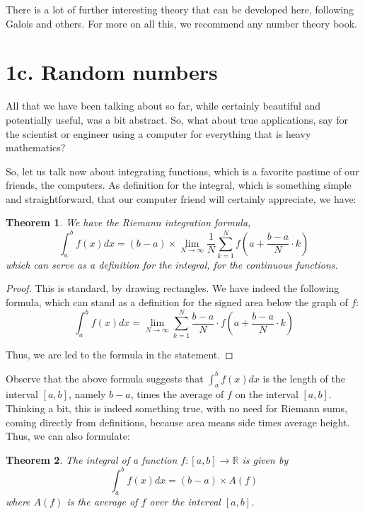 \documentclass[12pt]{amsbook}
\newtheorem{theorem}{Theorem}[chapter]
\begin{document}
There is a lot of further interesting theory that can be developed here, following Galois and others. For more on all this, we recommend any number theory book.

\section*{1c. Random numbers}

All that we have been talking about so far, while certainly beautiful and potentially useful, was a bit abstract. So, what about true applications, say for the scientist or engineer using a computer for everything that is heavy mathematics?

\bigskip

So, let us talk now about integrating functions, which is a favorite pastime of our friends, the computers. As definition for the integral, which is something simple and straightforward, that our computer friend will certainly appreciate, we have:


\begin{theorem}
We have the Riemann integration formula,
$$\int_a^bf(x)dx=(b-a)\times\lim_{N\to\infty}\frac{1}{N}\sum_{k=1}^Nf\left(a+\frac{b-a}{N}\cdot k\right)$$
which can serve as a definition for the integral, for the continuous functions.
\end{theorem}

\begin{proof}
This is standard, by drawing rectangles. We have indeed the following formula, which can stand as a definition for the signed area below the graph of $f$:
$$\int_a^bf(x)dx=\lim_{N\to\infty}\sum_{k=1}^N\frac{b-a}{N}\cdot f\left(a+\frac{b-a}{N}\cdot k\right)$$

Thus, we are led to the formula in the statement.
\end{proof}

Observe that the above formula suggests that $\int_a^bf(x)dx$ is the length of the interval $[a,b]$, namely $b-a$, times the average of $f$ on the interval $[a,b]$. Thinking a bit, this is indeed something true, with no need for Riemann sums, coming directly from definitions, because area means side times average height. Thus, we can also formulate:


\begin{theorem}
The integral of a function $f:[a,b]\to\mathbb R$ is given by
$$\int_a^bf(x)dx=(b-a)\times A(f)$$
where $A(f)$ is the average of $f$ over the interval $[a,b]$.
\end{theorem}
\end{document}
